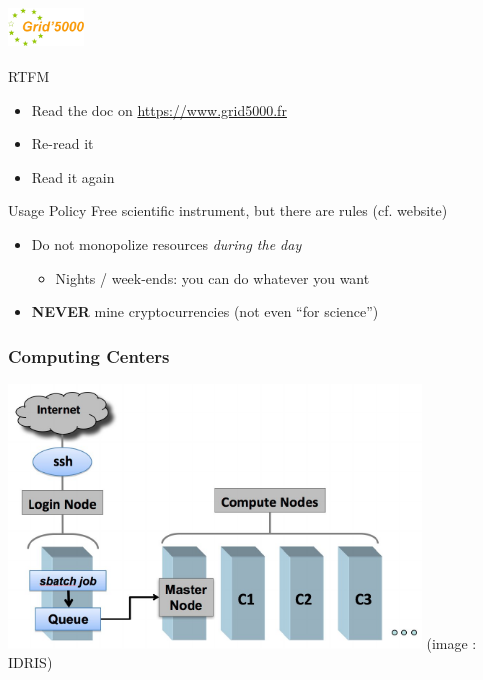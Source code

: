 \documentclass[10pt]{beamer}
\begin{document}

\begin{frame}[label=tme]
  \frametitle{\includegraphics[height=1cm]{grid5000_logo.png}}

  \begin{exampleblock}{RTFM}
    \begin{itemize}
    \item Read the doc on \url{https://www.grid5000.fr}
    \item Re-read it
    \item Read it again
    \end{itemize}
  \end{exampleblock}
  
  \medskip

  \begin{alertblock}{Usage Policy}
    Free scientific instrument, but there are rules (cf. website)
    \begin{itemize}
    \item Do not monopolize resources \emph{during the day}
      \begin{itemize}
      \item Nights / week-ends: you can do whatever you want
      \end{itemize}
    \item \textbf{NEVER} mine cryptocurrencies (not even ``for science'')
    \end{itemize}
  \end{alertblock}  
\end{frame}


\begin{frame}
  \frametitle{Computing Centers}

  \includegraphics[height=7cm]{compute_center.pdf}
  (image : IDRIS)
  
\end{frame}
 
\end{document}
